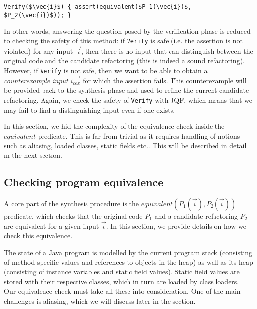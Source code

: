\documentclass[sigconf,review,anonymous]{acmart}
\begin{document}
\begin{lstlisting}[mathescape=true,showstringspaces=false]
Verify($\vec{i}$) { assert(equivalent($P_1(\vec{i})$, $P_2(\vec{i})$)); }
\end{lstlisting}

In other words, answering the question posed by the verification
phase is reduced to checking the safety of this method: if
\texttt{Verify} is safe (i.e. the assertion is not violated) for any
input~$\vec{i}$, then there is no input that can distinguish
between the original code and the candidate refactoring (this
is indeed a sound refactoring). However, if \texttt{Verify} is not safe,
then we want to be able to obtain a {\em counterexample input}
$\vec{i_{cex}}$ for which the assertion fails.
%
This counterexample will be provided back to the synthesis phase and
used to refine the current candidate refactoring. Again, we check the
safety of \texttt{Verify} with JQF,
which means that we may fail to find a distinguishing input even if one
exists.

In this section, we hid the complexity of the equivalence check inside
the $equivalent$ predicate. This is far from trivial as it requires handling
of notions such as aliasing, loaded classes, static fields etc.. This will be
described in detail in the next section.

\subsection{Checking program equivalence}\label{sec:equiv}

A core part of the synthesis procedure is the $equivalent(P_1(\vec{i}), P_2(\vec{i}))$ predicate,
which checks that the original code $P_1$ and a candidate refactoring $P_2$
are equivalent for a given input $\vec{i}$. %
In this section, we provide details on how we check this equivalence.

The state of a Java program is modelled by the current program stack
(consisting of method-specific values and references to objects in the
heap) as well as its heap (consisting of instance variables and static
field values). Static field values are stored with their respective
classes, which in turn are loaded by class loaders.  Our equivalence
check must take all these into consideration. One of the main challenges is aliasing, which we will discuss later in the section.
\end{document}
